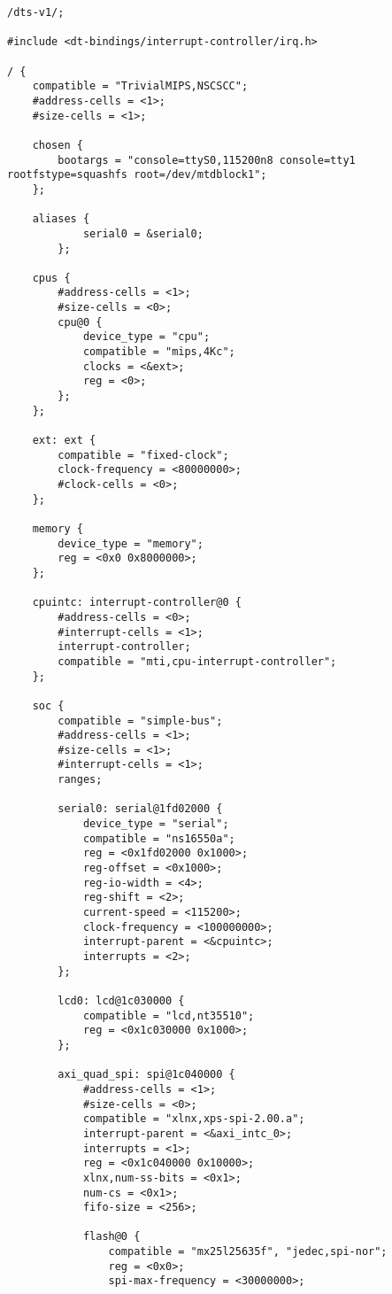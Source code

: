 \begin{verbatim}
/dts-v1/;

#include <dt-bindings/interrupt-controller/irq.h>

/ {
    compatible = "TrivialMIPS,NSCSCC";
    #address-cells = <1>;
    #size-cells = <1>;

    chosen {
        bootargs = "console=ttyS0,115200n8 console=tty1 rootfstype=squashfs root=/dev/mtdblock1";
    };

    aliases {
            serial0 = &serial0;
        };

    cpus {
        #address-cells = <1>;
        #size-cells = <0>;
        cpu@0 {
            device_type = "cpu";
            compatible = "mips,4Kc";
            clocks = <&ext>;
            reg = <0>;
        };
    };

    ext: ext {
        compatible = "fixed-clock";
        clock-frequency = <80000000>;
        #clock-cells = <0>;
    };

    memory {
        device_type = "memory";
        reg = <0x0 0x8000000>;
    };

    cpuintc: interrupt-controller@0 {
        #address-cells = <0>;
        #interrupt-cells = <1>;
        interrupt-controller;
        compatible = "mti,cpu-interrupt-controller";
    };

    soc {
        compatible = "simple-bus";
        #address-cells = <1>;
        #size-cells = <1>;
        #interrupt-cells = <1>;
        ranges;

        serial0: serial@1fd02000 {
            device_type = "serial";
            compatible = "ns16550a";
            reg = <0x1fd02000 0x1000>;
            reg-offset = <0x1000>;
            reg-io-width = <4>;
            reg-shift = <2>;
            current-speed = <115200>;
            clock-frequency = <100000000>;
            interrupt-parent = <&cpuintc>;
            interrupts = <2>;
        };

        lcd0: lcd@1c030000 {
            compatible = "lcd,nt35510";
            reg = <0x1c030000 0x1000>;
        };

        axi_quad_spi: spi@1c040000 {
            #address-cells = <1>;
            #size-cells = <0>;
            compatible = "xlnx,xps-spi-2.00.a";
            interrupt-parent = <&axi_intc_0>;
            interrupts = <1>;
            reg = <0x1c040000 0x10000>;
            xlnx,num-ss-bits = <0x1>;
            num-cs = <0x1>;
            fifo-size = <256>;

            flash@0 {
                compatible = "mx25l25635f", "jedec,spi-nor";
                reg = <0x0>;
                spi-max-frequency = <30000000>;


\end{verbatim}
